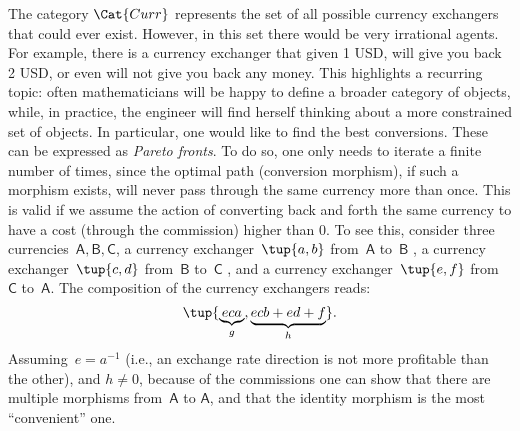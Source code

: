 

The category $\Cat{Curr}$ represents the set of all possible currency exchangers that could
ever exist. However, in this set there would be very irrational agents. For example, there is a currency exchanger that given 1 USD, will give you back 2 USD, or even will not give you back any money. This highlights a recurring topic: often mathematicians will be happy to define a broader category of objects, while, in practice, the engineer will find herself thinking about a more constrained set of objects. In particular, one would like to find the best conversions. These can be expressed as \emph{Pareto fronts}. To do so, one only needs to iterate a finite number of times, since the optimal path (conversion morphism), if such a morphism exists, will never pass through the same currency more than once.  This is valid if we assume the action of converting back and forth the same currency to have a cost (through the commission) higher than 0. To see this, consider three currencies~$\mathsf{A,B,C}$, a currency exchanger~$\tup{a,b}$ from~$\mathsf{A}$ to~$\mathsf{B}$ , a currency exchanger~$\tup{c,d}$ from~$\mathsf{B}$ to~$\mathsf{C}$ , and a currency exchanger~$\tup{e,f}$ from~$\mathsf{C}$ to~$\mathsf{A}$.  The composition of the currency exchangers reads:
\begin{equation*}
\tup{\underbrace{eca}_{g}, \underbrace{ecb+ed+f}_{h}}.
\end{equation*}
Assuming~$e=a^{-1}$ (i.e., an exchange rate direction is not more profitable than the other), and $h\neq 0$, because of the commissions one can show that there are multiple morphisms from~$\mathsf{A}$ to $\mathsf{A}$, and that the identity morphism is the most ``convenient'' one.

